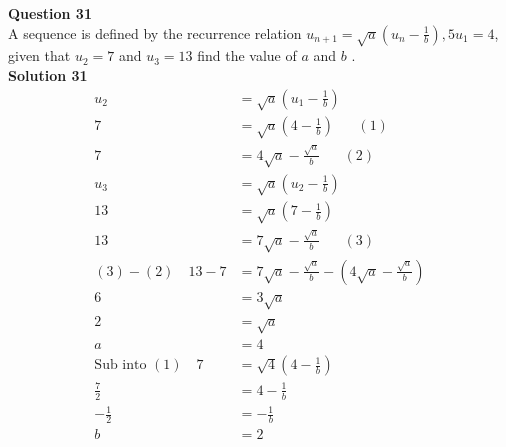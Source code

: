 \documentclass{article}
\begin{document}
\noindent\textbf{Question 31}\\[5pt]
A sequence is defined by the recurrence relation $u_{n+1}=\sqrt{a}\left(u_n-\displaystyle\frac{1}{b}\right),5 u_1=4$, given that $u_2=7$ and $u_3=13$ find the value of $a$ and $b$ .\\[5pt]
\noindent\textbf{Solution 31}\\[5pt]
\begin{align*}
u_2&=\sqrt{a}\left(u_1-\displaystyle\frac{1}{b}\right)\\[2pt]
7&=\sqrt{a}\left(4-\displaystyle\frac{1}{b}\right)\hspace{20pt}(1)\\[2pt]
7&=4\sqrt{a}-\displaystyle\frac{\sqrt{a}}{b}\hspace{20pt}(2)\\[12pt]
u_3&=\sqrt{a}\left(u_2-\displaystyle\frac{1}{b}\right)\\[2pt]
13&=\sqrt{a}\left(7-\displaystyle\frac{1}{b}\right)\\[2pt]
13&=7\sqrt{a}-\displaystyle\frac{\sqrt{a}}{b}\hspace{20pt}(3)\\[12pt]
(3)-(2)\quad13-7&=7\sqrt{a}-\displaystyle\frac{\sqrt{a}}{b}-\left(4\sqrt{a}-\displaystyle\frac{\sqrt{a}}{b}\right)\\[2pt]
6&=3\sqrt{a}\\[2pt]
2&=\sqrt{a}\\[2pt]
a&=4\\[12pt]
\text{Sub into} \,\,(1)\quad 7&=\sqrt{4}\left(4-\displaystyle\frac{1}{b}\right)\\[2pt]
\displaystyle\frac{7}{2}&=4-\displaystyle\frac{1}{b}\\[2pt]
-\displaystyle\frac{1}{2}&=-\displaystyle\frac{1}{b}\\[2pt]
b&=2
\end{align*}\\[10pt]
\end{document}
